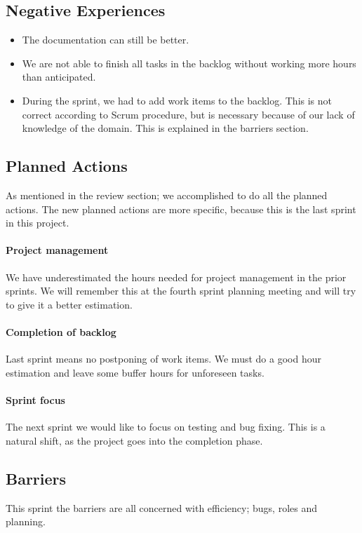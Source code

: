 \subsection{Negative Experiences}
\begin{itemize}
	\item The documentation can still be better.
	\item We are not able to finish all tasks in the backlog without working more hours than anticipated.
	\item During the sprint, we had to add work items to the backlog. This is not correct according to Scrum procedure, but is necessary because of our lack of knowledge of the domain. This is explained in the barriers section.  
\end{itemize}


\subsection{Planned Actions}
As mentioned in the review section; we accomplished to do all the planned actions. The new planned actions are more specific, because this is the last sprint in this project.

\paragraph{Project management}
We have underestimated the hours needed for project management in the prior sprints. We will remember this at the fourth sprint planning meeting and will try to give it a better estimation.
\paragraph{Completion of backlog}
Last sprint means no postponing of work items. We must do a good hour estimation and leave some buffer hours for unforeseen tasks.
\paragraph{Sprint focus}
The next sprint we would like to focus on testing and bug fixing. This is a natural shift, as the project goes into the completion phase. 

\subsection{Barriers}
This sprint the barriers are all concerned with efficiency; bugs, roles and planning.
